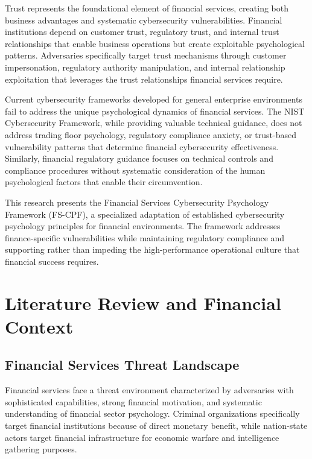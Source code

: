 \documentclass[10pt, twocolumn]{article}
\begin{document}
Trust represents the foundational element of financial services, creating both business advantages and systematic cybersecurity vulnerabilities. Financial institutions depend on customer trust, regulatory trust, and internal trust relationships that enable business operations but create exploitable psychological patterns. Adversaries specifically target trust mechanisms through customer impersonation, regulatory authority manipulation, and internal relationship exploitation that leverages the trust relationships financial services require.

Current cybersecurity frameworks developed for general enterprise environments fail to address the unique psychological dynamics of financial services. The NIST Cybersecurity Framework, while providing valuable technical guidance, does not address trading floor psychology, regulatory compliance anxiety, or trust-based vulnerability patterns that determine financial cybersecurity effectiveness. Similarly, financial regulatory guidance focuses on technical controls and compliance procedures without systematic consideration of the human psychological factors that enable their circumvention.

This research presents the Financial Services Cybersecurity Psychology Framework (FS-CPF), a specialized adaptation of established cybersecurity psychology principles for financial environments. The framework addresses finance-specific vulnerabilities while maintaining regulatory compliance and supporting rather than impeding the high-performance operational culture that financial success requires.

\section{Literature Review and Financial Context}

\subsection{Financial Services Threat Landscape}

Financial services face a threat environment characterized by adversaries with sophisticated capabilities, strong financial motivation, and systematic understanding of financial sector psychology. Criminal organizations specifically target financial institutions because of direct monetary benefit, while nation-state actors target financial infrastructure for economic warfare and intelligence gathering purposes.
\end{document}
